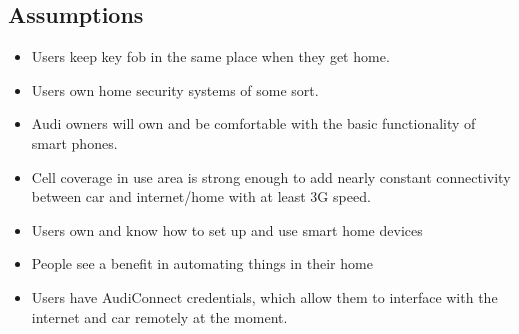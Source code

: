 \subsection*{Assumptions} 
\begin{itemize}

    \item Users keep key fob in the same place when they get home.
	\item Users own home security systems of some sort.
	\item Audi owners will own and be comfortable with the basic functionality of smart phones. 
	\item Cell coverage in use area is strong enough to add nearly constant connectivity between car 
and internet/home with at least 3G speed.
	\item Users own and know how to set up and use smart home devices 
	\item People see a benefit in automating things in their home 
	\item Users have AudiConnect credentials, which allow them to interface with the internet and car remotely at the moment.

\end{itemize}


 